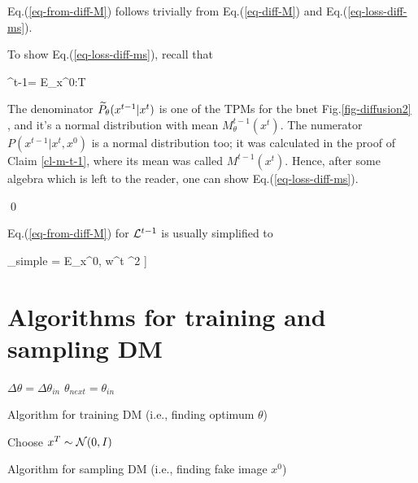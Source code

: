 Eq.(\ref{eq-from-diff-M})
 follows trivially from
Eq.(\ref{eq-diff-M})
and Eq.(\ref{eq-loss-diff-ms}).

To show Eq.(\ref{eq-loss-diff-ms}),
 recall that

\beq
\call^{t-1}=
E_{x^{0:T}}
\eeq

The denominator
${{\widetilde{P}}_\theta}(x^{t-1}|x^t)$
is one of the TPMs for
the bnet Fig.\ref{fig-diffusion2} ,
and it's a normal distribution
with mean $M^{t-1}_\theta(x^t)$.
The numerator
$P(x^{t-1}|x^t,x^0)$ is
a normal distribution too;
it was calculated
in the proof
of Claim \ref{cl-m-t-1},
where its mean was called
$M^{t-1}(x^t)$.
Hence, after
some algebra
which is left to the
reader,
one can show Eq.(\ref{eq-loss-diff-ms}). 


\qed

Eq.(\ref{eq-from-diff-M})
for ${\cal L}^{t-1}$
is usually simplified to

\beq
\call_{simple} =
E_{x^0, w^t}
\left[
\left[w^t-n^{t-1}_\theta(
\sqrt{\prodalp}\; x^{0}
 +\sqrt{1-\prodalp}\;w^t
)\right]^2
\right]
\label{eq-diff-loss-simple}
\eeq

\section{Algorithms for training
and sampling DM}

\begin{algorithm}
	\DontPrintSemicolon
    $\Delta\theta = \Delta\theta_{in}$\;
    $\theta_{next} = \theta_{in}$\;
    \caption{Algorithm for training DM (i.e., finding optimum $\theta$)}
\end{algorithm}

\begin{algorithm}
	\DontPrintSemicolon
    Choose $x^T\sim{\cal N}(0, I)$\;
    \caption{Algorithm for sampling DM (i.e., finding fake image $x^0$)}
\end{algorithm}
